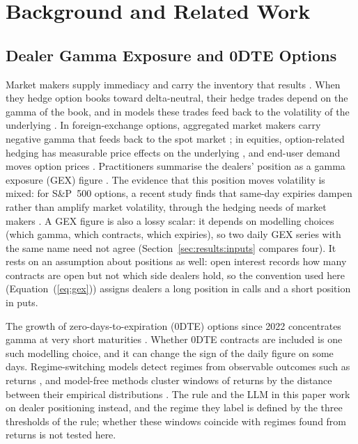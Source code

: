 \section{Background and Related Work}
\label{sec:background}

\subsection{Dealer Gamma Exposure and 0DTE Options}
\label{sec:background:gex}

Market makers supply immediacy and carry the inventory that results \cite{grossman1988liquidity}. When they hedge option books toward delta-neutral, their hedge trades depend on the gamma of the book, and in models these trades feed back to the volatility of the underlying \cite{frey1997feedback}. In foreign-exchange options, aggregated market makers carry negative gamma that feeds back to the spot market \cite{anderegg2022impact}; in equities, option-related hedging has measurable price effects on the underlying \cite{ni2005stock,baltussen2021hedging}, and end-user demand moves option prices \cite{garleanu2009demand}. Practitioners summarise the dealers' position as a gamma exposure (GEX) figure \cite{spotgamma2021,fishman2023gamma}. The evidence that this position moves volatility is mixed: for S\&P~500 options, a recent study finds that same-day expiries dampen rather than amplify market volatility, through the hedging needs of market makers \cite{adams2025zerodte}. A GEX figure is also a lossy scalar: it depends on modelling choices (which gamma, which contracts, which expiries), so two daily GEX series with the same name need not agree (Section~\ref{sec:results:inputs} compares four). It rests on an assumption about positions as well: open interest records how many contracts are open but not which side dealers hold, so the convention used here (Equation~(\ref{eq:gex})) assigns dealers a long position in calls and a short position in puts.

The growth of zero-days-to-expiration (0DTE) options since 2022 concentrates gamma at very short maturities \cite{cboe2024zero,cboe2025spx0dte,dim2023odtes,adams2025zerodte}. Whether 0DTE contracts are included is one such modelling choice, and it can change the sign of the daily figure on some days. Regime-switching models detect regimes from observable outcomes such as returns \cite{hamilton1989new,ang2002regime,nystrup2020regime}, and model-free methods cluster windows of returns by the distance between their empirical distributions \cite{horvath2024clustering}. The rule and the LLM in this paper work on dealer positioning instead, and the regime they label is defined by the three thresholds of the rule; whether these windows coincide with regimes found from returns is not tested here.

